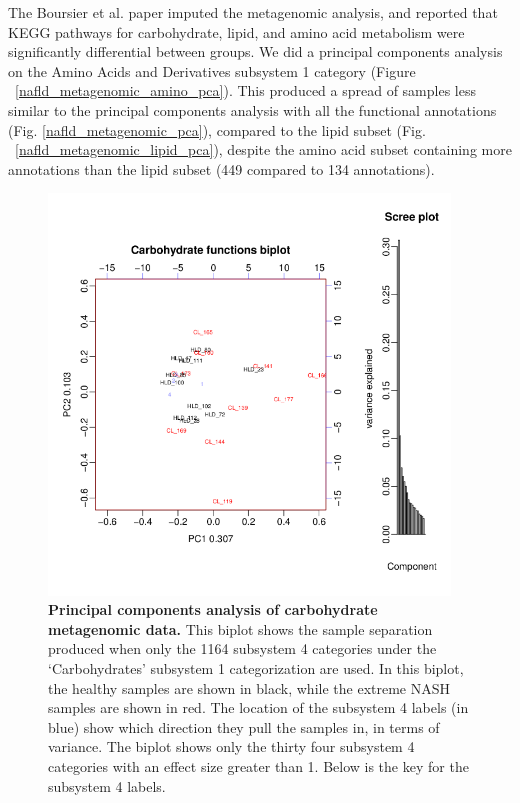 The Boursier et al. \cite{boursier2016severity} paper imputed the metagenomic analysis, and reported that KEGG pathways for carbohydrate, lipid, and amino acid metabolism were significantly differential between groups. We did a principal components analysis on the Amino Acids and Derivatives subsystem 1 category (Figure ~\ref{nafld_metagenomic_amino_pca}). This produced a spread of samples less similar to the principal components analysis with all the functional annotations (Fig. \ref{nafld_metagenomic_pca}), compared to the lipid subset (Fig. ~\ref{nafld_metagenomic_lipid_pca}), despite the amino acid subset containing more annotations than the lipid subset (449 compared to 134 annotations).

\begin{figure}[h]
\begin{center}
\includegraphics[width=0.95\textwidth]{metagenomic_carb_pca.png}
\caption[Principal components analysis of carbohydrate metagenomic data.]{\textbf{Principal components analysis of carbohydrate metagenomic data.} This biplot shows the sample separation produced when only the 1164 subsystem 4 categories under the `Carbohydrates' subsystem 1 categorization are used. In this biplot, the healthy samples are shown in black, while the extreme NASH samples are shown in red. The location of the subsystem 4 labels (in blue) show which direction they pull the samples in, in terms of variance. The biplot shows only the thirty four subsystem 4 categories with an effect size greater than 1. Below is the key for the subsystem 4 labels.
}
\end{center}
\end{figure}
